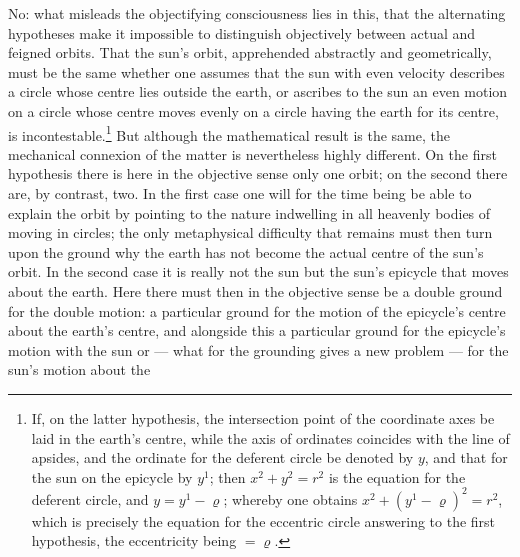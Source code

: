 \documentclass[12pt,a4paper]{book}
\begin{document}
No: what misleads the objectifying consciousness lies in this, that the alternating hypotheses make it
impossible to distinguish objectively between actual and feigned orbits. That the sun's orbit, apprehended
abstractly and geometrically, must be the same whether one assumes that the sun with even velocity
describes a circle whose centre lies outside the earth, or ascribes to the sun an even motion on a circle
whose centre moves evenly on a circle having the earth for its centre, is
incontestable.\footnote{%
If, on the latter hypothesis, the intersection point of the coordinate axes be laid in the earth's centre,
while the axis of ordinates coincides with the line of apsides, and the ordinate for the deferent circle
be denoted by $y$, and that for the sun on the epicycle by $y^{1}$; then $x^{2} + y^{2} = r^{2}$ is the
equation for the deferent circle, and $y = y^{1} - \varrho$; whereby one obtains
$x^{2} + (y^{1} - \varrho)^{2} = r^{2}$, which is precisely the equation for the eccentric circle answering
to the first hypothesis, the eccentricity being $= \varrho$.} But although the mathematical result is the
same, the mechanical connexion of the matter is nevertheless highly different. On the first hypothesis
there is here in the objective sense only one orbit; on the second there are, by contrast, two. In the
first case one will for the time being be able to explain the orbit by pointing to the nature indwelling
in all heavenly bodies of moving in circles; the only metaphysical difficulty that remains must then turn
upon the ground why the earth has not become the actual centre of the sun's orbit. In the second case it
is really not the sun but the sun's epicycle that moves about the earth. Here there must then in the
objective sense be a double ground for the double motion: a particular ground for the motion of the
epicycle's centre about the earth's centre, and alongside this a particular ground for the epicycle's
motion with the sun or --- what for the grounding gives a new problem --- for the sun's motion about the
\end{document}
